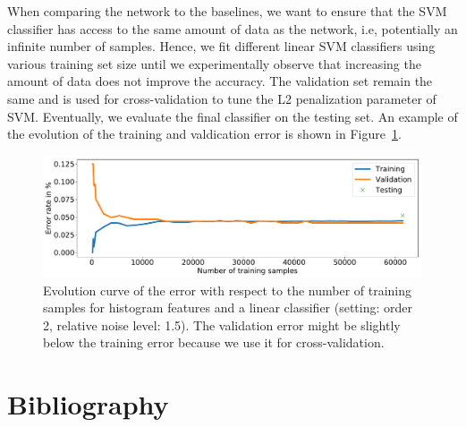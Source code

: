 \documentclass[final,twocolumn,3p,times,authoryear]{elsarticle}
\newcommand{\figref}[1]{Figure~\ref{fig:#1}}
\newcommand{\1}{\b{1}}              %
\newcommand{\0}{\b{0}}              %
\begin{document}
When comparing the network to the baselines, we want to ensure that the SVM classifier has
access to the same amount of data as the network, i.e, potentially an
infinite number of samples. Hence, we fit different linear SVM classifiers using
various training set size until we experimentally observe that
increasing the amount of data does not improve the accuracy. The validation
set remain the same and is used for cross-validation to tune the L2
penalization parameter of SVM. Eventually, we evaluate the final classifier on
the testing set. An example of the evolution of the training and valdication
error is shown in \figref{hist_error_evolution}.

\begin{figure}
\centering
\includegraphics[width=\linewidth]{hist_error_order2_noise1_5}
\caption{Evolution curve of the error with respect to the number of training samples for histogram features and a linear classifier (setting: order 2, relative noise level: 1.5). The validation error might be slightly below the training error because we use it for cross-validation.}
\label{fig:hist_error_evolution}
\end{figure}

\section*{Bibliography}


\end{document}
